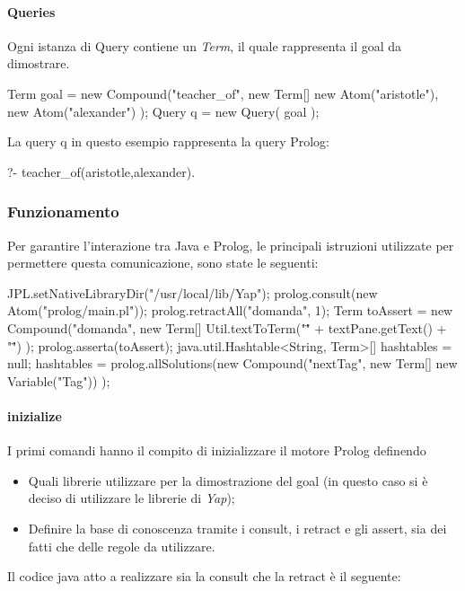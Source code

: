 \paragraph{Queries}
Ogni istanza di Query contiene un \emph{Term}, il quale rappresenta il goal da dimostrare.

\begin{javacode}
	Term goal = new Compound("teacher_of",
	new Term[] {
		new Atom("aristotle"),
		new Atom("alexander")
	}
	);
	Query q = new Query( goal );
\end{javacode}

La query q in questo esempio rappresenta la query Prolog:

\begin{prologcode}
	?- teacher_of(aristotle,alexander).
\end{prologcode}

\subsubsection{Funzionamento}
Per garantire l'interazione tra Java e Prolog, le principali istruzioni utilizzate per permettere questa comunicazione, sono state le seguenti:

\begin{javacode}
	JPL.setNativeLibraryDir("/usr/local/lib/Yap");
	prolog.consult(new Atom("prolog/main.pl"));
	prolog.retractAll("domanda", 1);
	Term toAssert = new Compound("domanda", 
	new Term[]{
		Util.textToTerm("\"" + textPane.getText() + "\"")}
	);
	prolog.asserta(toAssert);
	java.util.Hashtable<String, Term>[] hashtables = null;
	hashtables = prolog.allSolutions(new Compound("nextTag", 
	new Term[]{
		new Variable("Tag")})
	);  
\end{javacode}
\paragraph{inizialize}
I primi comandi hanno il compito di inizializzare il motore Prolog definendo 
\begin{itemize}
	\item Quali librerie utilizzare per la dimostrazione del goal (in questo caso si è deciso di utilizzare le librerie di \emph{Yap});
	\item Definire la base di conoscenza tramite i consult, i retract e gli assert, sia dei fatti che delle regole da utilizzare.
\end{itemize}
Il codice java atto a realizzare sia la consult che la retract è il seguente:

